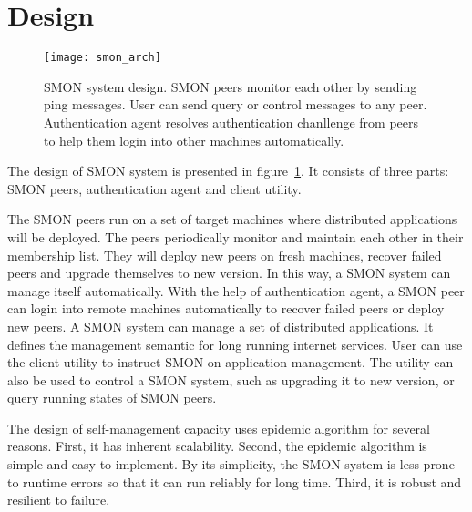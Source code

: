 \section{Design}
\label{sec:design}


\begin{figure}
\centering
\texttt{[image: smon\_arch]}
\caption{SMON system design. SMON peers monitor each
other by sending ping messages. User can send query or control messages
to any peer. Authentication agent resolves authentication
chanllenge from peers to help them login into other machines
automatically.}
\label{fig:smon_arch}
\end{figure}

The design of SMON system is presented in
figure~\ref{fig:smon_arch}.  It consists of three parts: SMON
peers, authentication agent and client utility.

The SMON peers run on a set of target machines where
distributed applications will be deployed. The peers
periodically monitor and maintain each other in their
membership list. They will deploy new peers on fresh
machines, recover failed peers and upgrade themselves to new
version. In this way, a SMON system can manage itself
automatically. With the help of authentication agent, a SMON
peer can login into remote machines automatically to recover
failed peers or deploy new peers. A SMON system can manage a
set of distributed applications. It defines the management
semantic for long running internet services.  User can use
the client utility to instruct SMON on application
management. The utility can also be used to control a SMON
system, such as upgrading it to new version, or query
running states of SMON peers.


The design of self-management capacity uses epidemic
algorithm for several reasons.  First, it has inherent
scalability. Second, the epidemic algorithm is simple and
easy to implement. By its simplicity, the SMON system is
less prone to runtime errors so that it can run reliably for
long time. Third, it is robust and resilient to failure.

